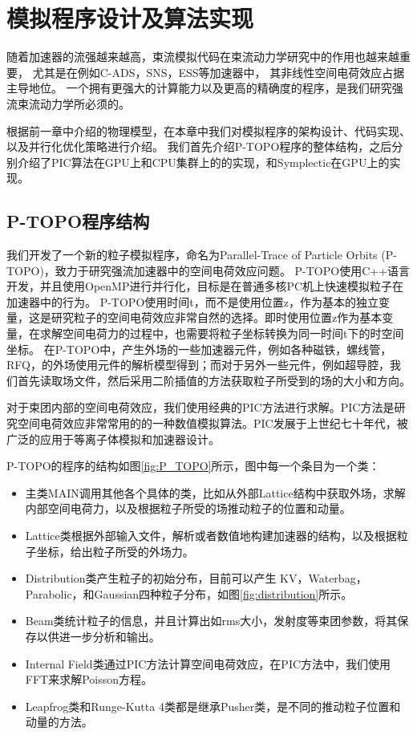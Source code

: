 
\chapter{模拟程序设计及算法实现}
\label{chap:Code}
随着加速器的流强越来越高，束流模拟代码在束流动力学研究中的作用也越来越重要，
尤其是在例如C-ADS，SNS，ESS等加速器中\cite{li2013physics,henderson2014spallation,eshraqi2016ess}，
其非线性空间电荷效应占据主导地位。
一个拥有更强大的计算能力以及更高的精确度的程序，是我们研究强流束流动力学所必须的。

根据前一章中介绍的物理模型，在本章中我们对模拟程序的架构设计、代码实现、以及并行化优化策略进行介绍。
我们首先介绍P-TOPO程序的整体结构，之后分别介绍了PIC算法在GPU上和CPU集群上的的实现，和Symplectic在GPU上的实现。

\section{P-TOPO程序结构}
我们开发了一个新的粒子模拟程序，命名为Parallel-Trace of Particle Orbits (P-TOPO)，致力于研究强流加速器中的空间电荷效应问题\cite{li2016nonlinear,li2014envelope,li16collective,li2015space}。
P-TOPO使用C++语言开发，并且使用OpenMP进行并行化，目标是在普通多核PC机上快速模拟粒子在加速器中的行为。
P-TOPO使用时间t，而不是使用位置z，作为基本的独立变量，这是研究粒子的空间电荷效应非常自然的选择。即时使用位置z作为基本变量，在求解空间电荷力的过程中，也需要将粒子坐标转换为同一时间t下的时空间坐标。
在P-TOPO中，产生外场的一些加速器元件，例如各种磁铁，螺线管，RFQ，的外场使用元件的解析模型得到；而对于另外一些元件，例如超导腔，我们首先读取场文件\cite{studio2008cst}，然后采用二阶插值的方法获取粒子所受到的场的大小和方向。

对于束团内部的空间电荷效应，我们使用经典的PIC方法进行求解\cite{hockney1988computer}。PIC方法是研究空间电荷效应非常常用的的一种数值模拟算法\cite{PIC_birdsall2004plasma,PIC_luccio2002space}。PIC发展于上世纪七十年代，被广泛的应用于等离子体模拟和加速器设计。

P-TOPO的程序的结构如图\ref{fig:P_TOPO}所示，图中每一个条目为一个类：
\begin{itemize}
  \item 主类MAIN调用其他各个具体的类，比如从外部Lattice结构中获取外场，求解内部空间电荷力，以及根据粒子所受的场推动粒子的位置和动量。
  \item Lattice类根据外部输入文件，解析或者数值地构建加速器的结构，以及根据粒子坐标，给出粒子所受的外场力。
  \item Distribution类产生粒子的初始分布，目前可以产生 KV，Waterbag，Parabolic，和Gaussian四种粒子分布，如图\ref{fig:distribution}所示。
  \item Beam类统计粒子的信息，并且计算出如rms大小，发射度等束团参数，将其保存以供进一步分析和输出。
  \item Internal Field类通过PIC方法计算空间电荷效应，在PIC方法中，我们使用FFT来求解Poisson方程。
  \item Leapfrog类和Runge-Kutta 4类都是继承Pusher类，是不同的推动粒子位置和动量的方法。
\end{itemize}

